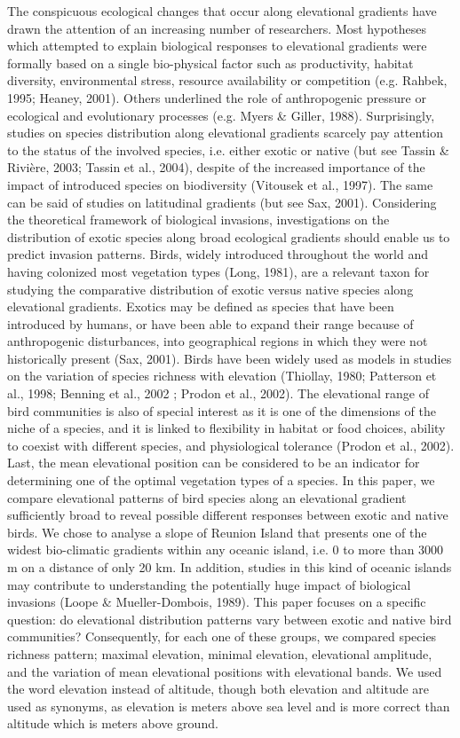 \documentclass{article}
\begin{document}
The conspicuous ecological changes that occur along elevational gradients have drawn the attention of an increasing number of researchers. Most hypotheses which attempted to explain biological responses to elevational gradients were formally based on a single bio-physical factor such as productivity, habitat diversity, environmental stress, resource availability or competition (e.g. Rahbek, 1995; Heaney, 2001). Others underlined the role of anthropogenic pressure or ecological and evolutionary processes (e.g. Myers \& Giller, 1988). 
Surprisingly, studies on species distribution along elevational gradients scarcely pay attention to the status of the involved species, i.e. either exotic or native (but see Tassin \& Rivière, 2003; Tassin et al., 2004), despite of the increased importance of the impact of introduced species on biodiversity (Vitousek et al., 1997). The same can be said of studies on latitudinal gradients (but see Sax, 2001). Considering the theoretical framework of biological invasions, investigations on the distribution of exotic species along broad ecological gradients should enable us to predict invasion patterns. 
Birds, widely introduced throughout the world and having colonized most vegetation types (Long, 1981), are a relevant taxon for studying the comparative distribution of exotic versus native species along elevational gradients. Exotics may be defined as species that have been introduced by humans, or have been able to expand their range because of anthropogenic disturbances, into geographical regions in which they were not historically present (Sax, 2001). Birds have been widely used as models in studies on the variation of species richness with elevation (Thiollay, 1980; Patterson et al., 1998; Benning et al., 2002 ; Prodon et al., 2002). The elevational range of bird communities is also of special interest as it is one of the dimensions of the niche of a species, and it is linked to flexibility in habitat or food choices, ability to coexist with different species, and physiological tolerance (Prodon et al., 2002). Last, the mean elevational position can be considered to be an indicator for determining one of the optimal vegetation types of a species. 
In this paper, we compare elevational patterns of bird species along an elevational gradient sufficiently broad to reveal possible different responses between exotic and native birds. We chose to analyse a slope of Reunion Island that presents one of the widest bio-climatic gradients within any oceanic island, i.e. 0 to more than 3000 m on a distance of only 20 km. In addition, studies in this kind of oceanic islands may contribute to understanding the potentially huge impact of biological invasions (Loope \& Mueller-Dombois, 1989). This paper focuses on a specific question: do elevational distribution patterns vary between exotic and native bird communities? Consequently, for each one of these groups, we compared species richness pattern; maximal elevation, minimal elevation, elevational amplitude, and the variation of mean elevational positions with elevational bands. We used the word elevation instead of altitude, though both elevation and altitude are used as synonyms, as elevation is meters above sea level and is more correct than altitude which is meters above ground.
\end{document}
